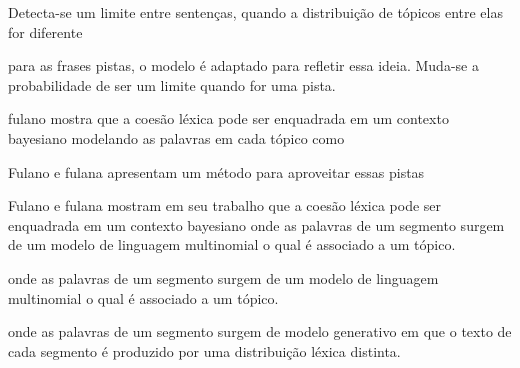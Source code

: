 {Detecta-se um limite entre sentenças, quando a distribuição de tópicos entre elas for diferente}



para as frases pistas, o modelo é adaptado para refletir essa ideia. Muda-se a probabilidade de ser um limite quando for uma pista.

fulano mostra que a coesão léxica pode ser enquadrada em um contexto bayesiano modelando as palavras em cada tópico como 








Fulano e fulana apresentam um método para aproveitar essas pistas





Fulano e fulana mostram em seu trabalho que a coesão léxica pode ser enquadrada em um contexto bayesiano onde as palavras de um segmento surgem de um modelo de linguagem multinomial o qual é associado a um tópico.


onde as palavras de um segmento surgem de um modelo de linguagem multinomial o qual é associado a um tópico.

onde as palavras de um segmento surgem de modelo generativo em que o texto de cada segmento é produzido por uma distribuição léxica distinta. 



















